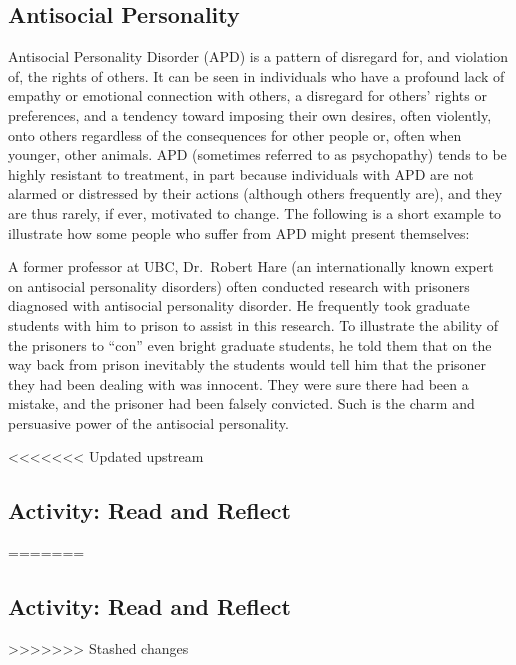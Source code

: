 \documentclass[
]{book}
\begin{document}
\hypertarget{antisocial-personality}{%
\subsection*{Antisocial Personality}\label{antisocial-personality}}

Antisocial Personality Disorder (APD) is a pattern of disregard for, and violation of, the rights of others. It can be seen in individuals who have a profound lack of empathy or emotional connection with others, a disregard for others' rights or preferences, and a tendency toward imposing their own desires, often violently, onto others regardless of the consequences for other people or, often when younger, other animals. APD (sometimes referred to as psychopathy) tends to be highly resistant to treatment, in part because individuals with APD are not alarmed or distressed by their actions (although others frequently are), and they are thus rarely, if ever, motivated to change. The following is a short example to illustrate how some people who suffer from APD might present themselves:

A former professor at UBC, Dr.~Robert Hare (an internationally known expert on antisocial personality disorders) often conducted research with prisoners diagnosed with antisocial personality disorder. He frequently took graduate students with him to prison to assist in this research. To illustrate the ability of the prisoners to ``con'' even bright graduate students, he told them that on the way back from prison inevitably the students would tell him that the prisoner they had been dealing with was innocent. They were sure there had been a mistake, and the prisoner had been falsely convicted. Such is the charm and persuasive power of the antisocial personality.

<<<<<<< Updated upstream
\hypertarget{activity-read-and-reflect-18}{%
\subsection*{Activity: Read and Reflect}\label{activity-read-and-reflect-18}}
=======
\hypertarget{activity-read-and-reflect-17}{%
\subsection*{Activity: Read and Reflect}\label{activity-read-and-reflect-17}}
>>>>>>> Stashed changes
\end{document}
